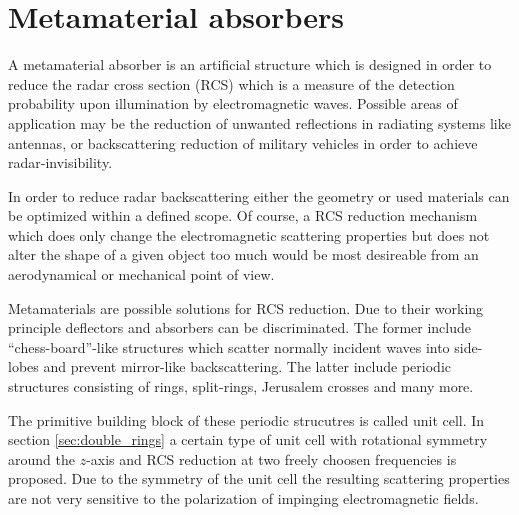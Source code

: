 \section{Metamaterial absorbers}
A metamaterial absorber is an artificial structure which is designed in order to
reduce the radar cross section (RCS) which is a measure of the detection probability upon illumination by electromagnetic waves. Possible areas of application 
may be the reduction of unwanted reflections in radiating systems like antennas, or backscattering reduction of military vehicles in order to achieve radar-invisibility.

In order to reduce radar backscattering either the geometry or used materials can be optimized within a defined scope. Of course, a RCS reduction mechanism which does only change the electromagnetic scattering properties but does not alter the shape of a given object too much would be most desireable from an aerodynamical or mechanical point of view.

Metamaterials are possible solutions for RCS reduction. Due to their working principle deflectors and absorbers can be discriminated. The former include "`chess-board"'-like structures which scatter normally incident waves into side-lobes and prevent mirror-like backscattering. The latter include periodic structures consisting of rings, split-rings, Jerusalem crosses and many more.

The primitive building block of these periodic strucutres is called unit cell. In section \ref{sec:double_rings} a certain type of unit cell with rotational symmetry around the $z$-axis and RCS reduction at two freely choosen frequencies is proposed. Due to the symmetry of the unit cell the resulting scattering properties are not very sensitive to the polarization of impinging electromagnetic fields.